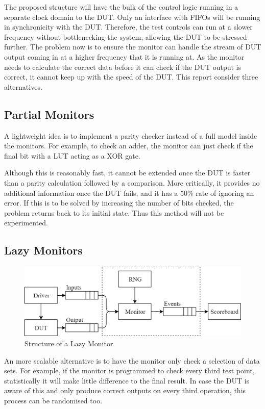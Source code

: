 The proposed structure will have the bulk of the control logic running in a separate clock domain to the DUT.
Only an interface with FIFOs will be running in synchronicity with the DUT.
Therefore, the test controls can run at a slower frequency without bottlenecking the system, allowing the DUT to be stressed further.
The problem now is to ensure the monitor can handle the stream of DUT output coming in at a higher frequency that it is running at.
As the monitor needs to calculate the correct data before it can check if the DUT output is correct, it cannot keep up with the speed of the DUT.
This report consider three alternatives.

\subsection{Partial Monitors}
A lightweight idea is to implement a parity checker instead of a full model inside the monitors.
For example, to check an adder, the monitor can just check if the final bit with a LUT acting as a XOR gate.

Although this is reasonably fast, it cannot be extended once the DUT is faster than a parity calculation followed by a comparison.
More critically, it provides no additional information once the DUT fails, and it has a 50\% rate of ignoring an error.
If this is to be solved by increasing the number of bits checked, the problem returns back to its initial state.
Thus this method will not be experimented.

\subsection{Lazy Monitors}

\begin{figure}[H]
  \centering
  \includegraphics[width=12cm]{img/LazMon}
  \caption{Structure of a Lazy Monitor}
  \label{LazMon}
\end{figure}

An more scalable alternative is to have the monitor only check a selection of data sets.
For example, if the monitor is programmed to check every third test point, statistically it will make little difference to the final result.
In case the DUT is aware of this and only produce correct outputs on every third operation, this process can be randomised too.

